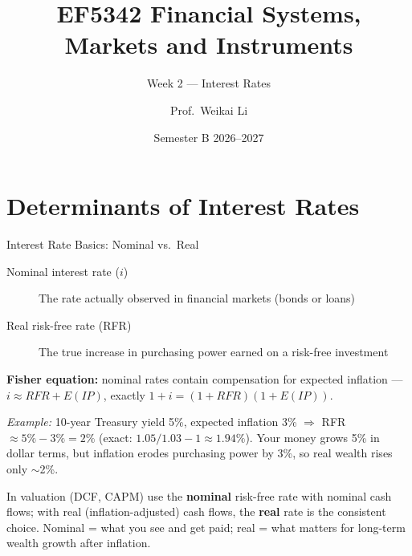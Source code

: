 \documentclass[aspectratio=169]{beamer}
\title{EF5342 Financial Systems, Markets and Instruments}
\subtitle{Week 2 --- Interest Rates}
\author{Prof.\ Weikai Li}
\institute{City University of Hong Kong}
\date{Semester B 2026--2027}
\begin{document}
\begin{frame}
\titlepage
\end{frame}


\section{Determinants of Interest Rates}

\begin{frame}{Interest Rate Basics: Nominal vs.\ Real}
\begin{description}
  \item[Nominal interest rate ($i$)] The rate actually observed in financial markets (bonds or loans)
  \item[Real risk-free rate (RFR)] The true increase in purchasing power earned on a risk-free investment
\end{description}
\vspace{0.3em}
\textbf{Fisher equation:} nominal rates contain compensation for expected inflation --- $i \approx RFR + E(IP)$, exactly $1+i = (1+RFR)(1+E(IP))$.
\vspace{0.3em}

\emph{Example:} 10-year Treasury yield 5\%, expected inflation 3\% $\Rightarrow$ RFR $\approx 5\%-3\% = 2\%$ (exact: $1.05/1.03 - 1 \approx 1.94\%$). Your money grows 5\% in dollar terms, but inflation erodes purchasing power by 3\%, so real wealth rises only $\sim$2\%.
\vspace{0.3em}

In valuation (DCF, CAPM) use the \textbf{nominal} risk-free rate with nominal cash flows; with real (inflation-adjusted) cash flows, the \textbf{real} rate is the consistent choice. Nominal = what you see and get paid; real = what matters for long-term wealth growth after inflation.
\end{frame}
\end{document}
